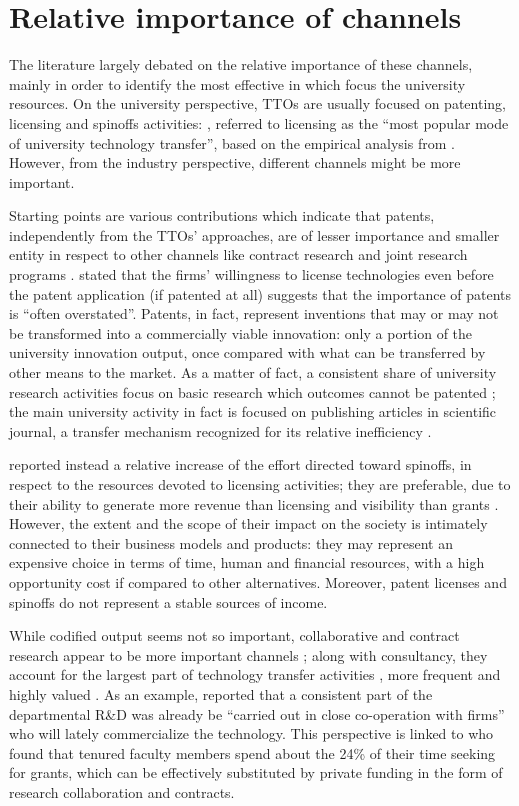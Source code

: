 \section{Relative importance of channels}

The literature largely debated on the relative importance of these channels, mainly in order to identify the most effective in which focus the university resources. On the university perspective, TTOs are usually focused on patenting, licensing and spinoffs activities: \citet{Chapple2005}, referred to licensing as the \enquote{most popular mode of university technology transfer}, based on the empirical analysis from \citet{Siegel2003}. However, from the industry perspective, different channels might be more important.

Starting points are various contributions which indicate that patents, independently from the TTOs' approaches, are of lesser importance and smaller entity in respect to other channels like contract research and joint research programs \citep{DEste2007}. \citet{Link2005} stated that the firms' willingness to license technologies even before the patent application (if patented at all) suggests that the importance of patents is \enquote{often overstated}. Patents, in fact, represent inventions that may or may not be transformed into a commercially viable innovation: only a portion of the university innovation output, once compared with what can be transferred by other means to the market. As a matter of fact, a consistent share of university research activities focus on basic research which outcomes cannot be patented \citep{Fritsch2007}; the main university activity in fact is focused on publishing articles in scientific journal, a transfer mechanism recognized for its relative inefficiency \citet{Rogers2001}. 

\citet{Balderi2007} reported instead a relative increase of the effort directed toward spinoffs, in respect to the resources devoted to licensing activities; they are preferable, due to their ability to generate more revenue than licensing and visibility than grants \citep{Rasmussen2006}. However, the extent and the scope of their impact on the society is intimately connected to their business models and products: they may represent an expensive choice in terms of time, human and financial resources, with a high opportunity cost if compared to other alternatives. Moreover, patent licenses and spinoffs do not represent a stable sources of income. 

While codified output seems not so important, collaborative and contract research appear to be more important channels \citep{Bekkers2008}; along with consultancy, they account for the largest part of technology transfer activities \citep{Muscio2010}, more frequent and highly valued \citep{DEste2011}. As an example, \citet{Rasmussen2006} reported that a consistent part of the departmental R\&D was already be \enquote{carried out in close co-operation with firms} who will lately commercialize the technology. This perspective is linked to \citet{Link2007} who found that tenured faculty members spend about the 24\% of their time seeking for grants, which can be effectively substituted by private funding in the form of research collaboration and contracts. 

